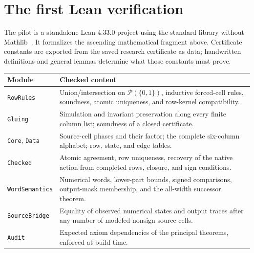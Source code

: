 \section{The first Lean verification}\label{sec:lean}

The pilot is a standalone Lean 4.33.0 project using the standard library without Mathlib~\cite{Lean4,LeanReference}. It formalizes the ascending mathematical fragment above. Certificate constants are exported from the saved research certificate as data; handwritten definitions and general lemmas determine what those constants must prove.

\begin{center}\small
\begin{tabularx}{\textwidth}{@{}lX@{}}
\toprule
Module & Checked content\\
\midrule
\texttt{RowRules} & Union/intersection on $\mathcal P(\{0,1\})$, inductive forced-cell rules, soundness, atomic uniqueness, and row-kernel compatibility.\\
\texttt{Gluing} & Simulation and invariant preservation along every finite column list; soundness of a closed certificate.\\
\texttt{Core}, \texttt{Data} & Source-cell phases and their factor; the complete six-column alphabet; row, state, and edge tables.\\
\texttt{Checked} & Atomic agreement, row uniqueness, recovery of the native action from completed rows, closure, and sign conditions.\\
\texttt{WordSemantics} & Numerical words, lower-part bounds, signed comparisons, output-mask membership, and the all-width successor theorem.\\
\texttt{SourceBridge} & Equality of observed numerical states and output traces after any number of modeled nonsign source cells.\\
\texttt{Audit} & Expected axiom dependencies of the principal theorems, enforced at build time.\\
\bottomrule
\end{tabularx}
\end{center}

